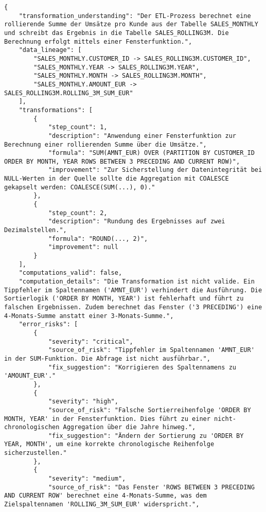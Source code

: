 \begin{lstlisting}[caption={Ausgabe: GEMINI 2.5 Pro Anwendungsfall 8 Konsistenzdurchlauf},label={gemini_case8_prompt2}]
{
    "transformation_understanding": "Der ETL-Prozess berechnet eine rollierende Summe der Umsätze pro Kunde aus der Tabelle SALES_MONTHLY und schreibt das Ergebnis in die Tabelle SALES_ROLLING3M. Die Berechnung erfolgt mittels einer Fensterfunktion.",
    "data_lineage": [
        "SALES_MONTHLY.CUSTOMER_ID -> SALES_ROLLING3M.CUSTOMER_ID",
        "SALES_MONTHLY.YEAR -> SALES_ROLLING3M.YEAR",
        "SALES_MONTHLY.MONTH -> SALES_ROLLING3M.MONTH",
        "SALES_MONTHLY.AMOUNT_EUR -> SALES_ROLLING3M.ROLLING_3M_SUM_EUR"
    ],
    "transformations": [
        {
            "step_count": 1,
            "description": "Anwendung einer Fensterfunktion zur Berechnung einer rollierenden Summe über die Umsätze.",
            "formula": "SUM(AMNT_EUR) OVER (PARTITION BY CUSTOMER_ID ORDER BY MONTH, YEAR ROWS BETWEEN 3 PRECEDING AND CURRENT ROW)",
            "improvement": "Zur Sicherstellung der Datenintegrität bei NULL-Werten in der Quelle sollte die Aggregation mit COALESCE gekapselt werden: COALESCE(SUM(...), 0)."
        },
        {
            "step_count": 2,
            "description": "Rundung des Ergebnisses auf zwei Dezimalstellen.",
            "formula": "ROUND(..., 2)",
            "improvement": null
        }
    ],
    "computations_valid": false,
    "computation_details": "Die Transformation ist nicht valide. Ein Tippfehler im Spaltennamen ('AMNT_EUR') verhindert die Ausführung. Die Sortierlogik ('ORDER BY MONTH, YEAR') ist fehlerhaft und führt zu falschen Ergebnissen. Zudem berechnet das Fenster ('3 PRECEDING') eine 4-Monats-Summe anstatt einer 3-Monats-Summe.",
    "error_risks": [
        {
            "severity": "critical",
            "source_of_risk": "Tippfehler im Spaltennamen 'AMNT_EUR' in der SUM-Funktion. Die Abfrage ist nicht ausführbar.",
            "fix_suggestion": "Korrigieren des Spaltennamens zu 'AMOUNT_EUR'."
        },
        {
            "severity": "high",
            "source_of_risk": "Falsche Sortierreihenfolge 'ORDER BY MONTH, YEAR' in der Fensterfunktion. Dies führt zu einer nicht-chronologischen Aggregation über die Jahre hinweg.",
            "fix_suggestion": "Ändern der Sortierung zu 'ORDER BY YEAR, MONTH', um eine korrekte chronologische Reihenfolge sicherzustellen."
        },
        {
            "severity": "medium",
            "source_of_risk": "Das Fenster 'ROWS BETWEEN 3 PRECEDING AND CURRENT ROW' berechnet eine 4-Monats-Summe, was dem Zielspaltennamen 'ROLLING_3M_SUM_EUR' widerspricht.",

\end{lstlisting}

